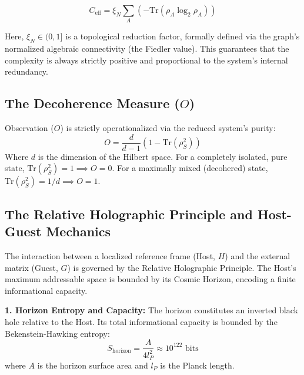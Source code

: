 \documentclass[12pt,a4paper]{article}
\begin{document}
\begin{equation}\label{eq:C_eff}
C_{\mathrm{eff}} = \xi_N \sum_{A} \left( - \text{Tr}(\rho_A \log_2 \rho_A) \right)
\end{equation}

Here, $\xi_N \in (0,1]$ is a topological reduction factor, formally defined via the graph's normalized algebraic connectivity (the Fiedler value). This guarantees that the complexity is always strictly positive and proportional to the system's internal redundancy.

\subsection{The Decoherence Measure ($O$)}
Observation ($O$) is strictly operationalized via the reduced system's purity:
\begin{equation}\label{eq:O_decoherence}
O = \frac{d}{d-1} \left( 1 - \text{Tr}(\rho_S^2) \right)
\end{equation}
Where $d$ is the dimension of the Hilbert space. For a completely isolated, pure state, $\text{Tr}(\rho_S^2) = 1 \implies O = 0$. For a maximally mixed (decohered) state, $\text{Tr}(\rho_S^2) = 1/d \implies O = 1$.

\subsection{The Relative Holographic Principle and Host-Guest Mechanics}

The interaction between a localized reference frame (Host, $H$) and the external matrix (Guest, $G$) is governed by the Relative Holographic Principle. The Host's maximum addressable space is bounded by its Cosmic Horizon, encoding a finite informational capacity.

\textbf{1. Horizon Entropy and Capacity:}
The horizon constitutes an inverted black hole relative to the Host. Its total informational capacity is bounded by the Bekenstein-Hawking entropy:
\begin{equation}
S_{\mathrm{horizon}} = \frac{A}{4 l_P^2} \approx 10^{122} \text{ bits}
\end{equation}
where $A$ is the horizon surface area and $l_P$ is the Planck length.
\end{document}
